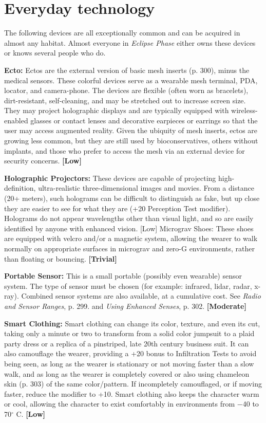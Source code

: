 \section{Everyday technology} \label{sec:everyday-tech} 

The following devices are all exceptionally common and can be acquired in almost any habitat. Almost everyone in \emph{Eclipse Phase} either owns these devices or knows several people who do. 

\textbf{Ecto:} Ectos are the external version of basic mesh inserts (p. 300), minus the medical sensors. These colorful devices serve as a wearable mesh terminal, PDA, locator, and camera-phone. The devices are flexible (often worn as bracelets), dirt-resistant, self-cleaning, and may be stretched out to increase screen size. They may project holographic displays and are typically equipped with wireless-enabled glasses or contact lenses and decorative earpieces or earrings so that the user may access augmented reality. Given the ubiquity of mesh inserts, ectos are growing less common, but they are still used by bioconservatives, others without implants, and those who prefer to access the mesh via an external device for security concerns. \textbf{[Low]} 

\textbf{Holographic Projectors:} These devices are capable of projecting high-definition, ultra-realistic three-dimensional images and movies. From a distance (20+ meters), such holograms can be difficult to distinguish as fake, but up close they are easier to see for what they are (+20 Perception Test modifier). Holograms do not appear wavelengths other than visual light, and so are easily identified by anyone with enhanced vision. [Low] Micrograv Shoes: These shoes are equipped with velcro and/or a magnetic system, allowing the wearer to walk normally on appropriate surfaces in micrograv and zero-G environments, rather than floating or bouncing. \textbf{[Trivial]} 

\textbf{Portable Sensor:} This is a small portable (possibly even wearable) sensor system. The type of sensor must be chosen (for example: infrared, lidar, radar, x-ray). Combined sensor systems are also available, at a cumulative cost. See \emph{Radio and Sensor Ranges}, p. 299. and \emph{Using Enhanced Senses}, p. 302. \textbf{[Moderate]} 

\textbf{Smart Clothing:} Smart clothing can change its color, texture, and even its cut, taking only a minute or two to transform from a solid color jumpsuit to a plaid party dress or a replica of a pinstriped, late 20th century business suit. It can also camouflage the wearer, providing a +20 bonus to Infiltration Tests to avoid being seen, as long as the wearer is stationary or not moving faster than a slow walk, and as long as the wearer is completely covered or also using chameleon skin (p. 303) of the same color/pattern. If incompletely camouflaged, or if moving faster, reduce the modifier to +10. Smart clothing also keeps the character warm or cool, allowing the character to exist comfortably in environments from $-$40 to 70$^{\circ}$ C. \textbf{[Low]} 

